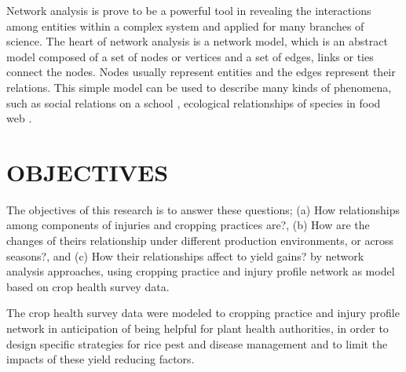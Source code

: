 Network analysis is prove to be a powerful tool in revealing the interactions among entities within a complex system and applied for many branches of science. The heart of network analysis is a network model, which is an abstract model composed of a set of nodes or vertices and a set of edges, links or ties connect the nodes. Nodes usually represent entities and the edges represent their relations. This simple model can be used to describe many kinds of phenomena, such as social relations on a school , ecological relationships of species in food web .

\section*{OBJECTIVES}


The objectives of this research is to answer these questions; (a) How relationships among components of injuries and cropping practices are?, (b) How are the changes of theirs relationship under different production environments, or across seasons?, and (c) How their relationships affect to yield gains? by network analysis approaches, using cropping practice and injury profile network as model based on crop health survey data.


The crop health survey data were modeled to cropping practice and injury profile network in anticipation of being helpful for plant health authorities, in order to design specific strategies for rice pest and disease management and to limit the impacts of these yield reducing factors.  


